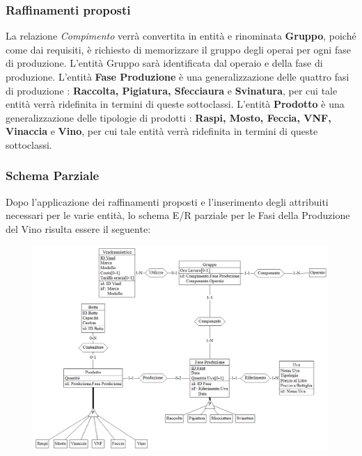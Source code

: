 \documentclass{article}
\begin{document}
\subsubsection{Raffinamenti proposti}
La relazione \textit{Compimento} verrà convertita in entità e rinominata \textbf{Gruppo}, poiché come dai requisiti, è richiesto di memorizzare il gruppo degli operai per ogni fase di produzione.
L'entità Gruppo sarà identificata dal operaio e della fase di produzione.
\newline
\newline
L'entità \textbf{Fase Produzione} è una generalizzazione delle quattro fasi di produzione : \textbf{Raccolta, Pigiatura, Sfecciaura} e \textbf{Svinatura}, per cui tale entità verrà ridefinita in termini di queste sottoclassi.
\newline
\newline
L'entità \textbf{Prodotto} è una generalizzazione delle tipologie di prodotti : \textbf{Raspi, Mosto, Feccia, VNF, Vinaccia} e \textbf{Vino}, per cui tale entità verrà ridefinita in termini di queste sottoclassi.
\newpage 
\subsubsection{Schema Parziale}
Dopo l'applicazione dei raffinamenti proposti e l'inserimento degli attribuiti necessari per le varie entità, lo schema E/R parziale per le Fasi della Produzione del Vino risulta essere il seguente:
\begin{figure}[htbp]
\centering
\includegraphics[width=1\textwidth]{img/Fasi_Parziale}
\end{figure}

\newpage
\end{document}
